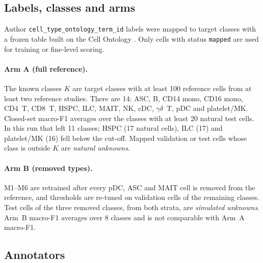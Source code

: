 \documentclass[11pt]{article}
\newcommand{\gd}{$\gamma\delta$~T}
\begin{document}
\subsection{Labels, classes and arms}

Author \nolinkurl{cell_type_ontology_term_id} labels were mapped to target classes with a frozen table built on the Cell Ontology \citep{diehl2016cl}. Only cells with status \texttt{mapped} are used for training or fine-level scoring.

\paragraph{Arm A (full reference).} The known classes $K$ are target classes with at least 100 reference cells from at least two reference studies. There are 14: ASC, B, CD14 mono, CD16 mono, CD4~T, CD8~T, HSPC, ILC, MAIT, NK, cDC, \gd, pDC and platelet/MK. Closed-set macro-F1 averages over the classes with at least 20 natural test cells. In this run that left 11 classes; HSPC (17 natural cells), ILC (17) and platelet/MK (16) fell below the cut-off. Mapped validation or test cells whose class is outside $K$ are \emph{natural unknowns}.

\paragraph{Arm B (removed types).} M1--M6 are retrained after every pDC, ASC and MAIT cell is removed from the reference, and thresholds are re-tuned on validation cells of the remaining classes. Test cells of the three removed classes, from both strata, are \emph{simulated unknowns}. Arm~B macro-F1 averages over 8 classes and is not comparable with Arm~A macro-F1.

\subsection{Annotators}
\end{document}
